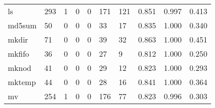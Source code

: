 \begin{longtable}{lp{2.0cm}p{2.0cm}p{2.0cm}p{2.0cm}p{2.0cm}p{2.0cm}p{2.0cm}p{2.0cm}p{2.0cm}}
ls        &                    293 &                                             1 &                                            0 &                                           0 &                                          171 &                                        121 &                                0.851 &                                  0.997 &                                0.413 \\
md5sum    &                     50 &                                             0 &                                            0 &                                           0 &                                           33 &                                         17 &                                0.835 &                                  1.000 &                                0.340 \\
mkdir     &                     71 &                                             0 &                                            0 &                                           0 &                                           39 &                                         32 &                                0.863 &                                  1.000 &                                0.451 \\
mkfifo    &                     36 &                                             0 &                                            0 &                                           0 &                                           27 &                                          9 &                                0.812 &                                  1.000 &                                0.250 \\
mknod     &                     41 &                                             0 &                                            0 &                                           0 &                                           29 &                                         12 &                                0.823 &                                  1.000 &                                0.293 \\
mktemp    &                     44 &                                             0 &                                            0 &                                           0 &                                           28 &                                         16 &                                0.841 &                                  1.000 &                                0.364 \\
mv        &                    254 &                                             1 &                                            0 &                                           0 &                                          176 &                                         77 &                                0.823 &                                  0.996 &                                0.303 \\

\end{longtable}
